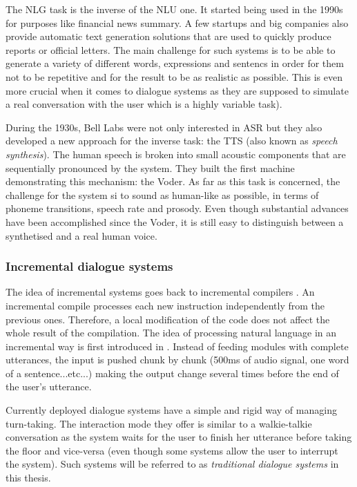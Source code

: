             The NLG task is the inverse of the NLU one. It started being used in the 1990s for purposes like financial news summary. A few startups and big companies also provide automatic text generation solutions that are used to quickly produce reports or official letters. The main challenge for such systems is to be able to generate a variety of different words, expressions and sentencs in order for them not to be repetitive and for the result to be as realistic as possible. This is even more crucial when it comes to dialogue systems as they are supposed to simulate a real conversation with the user which is a highly variable task).

            During the 1930s, Bell Labs were not only interested in ASR but they also developed a new approach for the inverse task: the TTS (also known as \textit{speech synthesis}). The human speech is broken into small acoustic components that are sequentially pronounced by the system. They built the first machine demonstrating this mechanism: the Voder. As far as this task is concerned, the challenge for the system si to sound as human-like as possible, in terms of phoneme transitions, speech rate and prosody. Even though substantial advances have been accomplished since the Voder, it is still easy to distinguish between a synthetised and a real human voice.


        \subsubsection{Incremental dialogue systems}
    
        	The idea of incremental systems goes back to incremental compilers \cite{Lock1965}. An incremental compile processes each new instruction independently from the previous ones. Therefore, a local modification of the code does not affect the whole result of the compilation. The idea of processing natural language in an incremental way is first introduced in \cite{Wiren1992}. Instead of feeding modules with complete utterances, the input is pushed chunk by chunk (500ms of audio signal, one word of a sentence...etc...) making the output change several times before the end of the user's utterance.

	    	Currently deployed dialogue systems have a simple and rigid way of managing turn-taking. The interaction mode they offer is similar to a walkie-talkie conversation as the system waits for the user to finish her utterance before taking the floor and vice-versa (even though some systems allow the user to interrupt the system). Such systems will be referred to as \textit{traditional dialogue systems} in this thesis.
        
